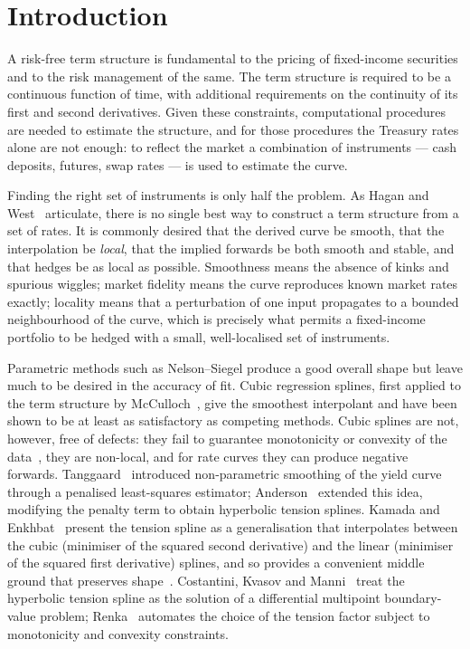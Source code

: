 \documentclass[10pt]{article}
\begin{document}
\section{Introduction}
A risk-free term structure is fundamental to the pricing of fixed-income securities and to
the risk management of the same. The term structure is required to be a continuous function
of time, with additional requirements on the continuity of its first and second derivatives.
Given these constraints, computational procedures are needed to estimate the structure, and
for those procedures the Treasury rates alone are not enough: to reflect the market a
combination of instruments --- cash deposits, futures, swap rates --- is used to estimate the
curve.

Finding the right set of instruments is only half the problem. As Hagan and West~\cite{Hagan}
articulate, there is no single best way to construct a term structure from a set of rates.
It is commonly desired that the derived curve be smooth, that the interpolation be
\emph{local}, that the implied forwards be both smooth and stable, and that hedges be as
local as possible. Smoothness means the absence of kinks and spurious wiggles; market
fidelity means the curve reproduces known market rates exactly; locality means that a
perturbation of one input propagates to a bounded neighbourhood of the curve, which is
precisely what permits a fixed-income portfolio to be hedged with a small, well-localised set
of instruments.

Parametric methods such as Nelson--Siegel produce a good overall shape but leave much to be
desired in the accuracy of fit. Cubic regression splines, first applied to the term structure
by McCulloch~\cite{McCulloch}, give the smoothest interpolant and have been shown to be at
least as satisfactory as competing methods. Cubic splines are not, however, free of defects:
they fail to guarantee monotonicity or convexity of the data~\cite{Anderson}, they are
non-local, and for rate curves they can produce negative forwards. Tanggaard~\cite{Tanggaard}
introduced non-parametric smoothing of the yield curve through a penalised least-squares
estimator; Anderson~\cite{Anderson} extended this idea, modifying the penalty term to obtain
hyperbolic tension splines. Kamada and Enkhbat~\cite{Kamada} present the tension spline as a
generalisation that interpolates between the cubic (minimiser of the squared second
derivative) and the linear (minimiser of the squared first derivative) splines, and so
provides a convenient middle ground that preserves shape~\cite{Costantini}. Costantini, Kvasov
and Manni~\cite{Costantini} treat the hyperbolic tension spline as the solution of a
differential multipoint boundary-value problem; Renka~\cite{Renka} automates the choice of the
tension factor subject to monotonicity and convexity constraints.
\end{document}
